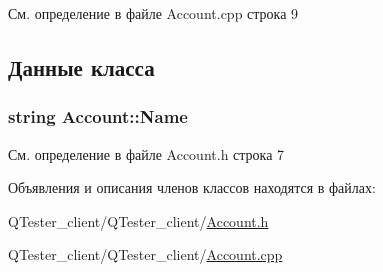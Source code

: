 См. определение в файле Account.\+cpp строка 9



\subsection{Данные класса}
\hypertarget{class_account_af13e63ff7407ac19e41e91afc40185b7}{}
\subsubsection[{Name}]{\setlength{\rightskip}{0pt plus 5cm}string Account\+::\+Name\hspace{0.3cm}{\ttfamily [protected]}}\label{class_account_af13e63ff7407ac19e41e91afc40185b7}


См. определение в файле Account.\+h строка 7



Объявления и описания членов классов находятся в файлах\+:\begin{DoxyCompactItemize}
\item 
Q\+Tester\+\_\+client/\+Q\+Tester\+\_\+client/\hyperlink{_account_8h}{Account.\+h}\item 
Q\+Tester\+\_\+client/\+Q\+Tester\+\_\+client/\hyperlink{_account_8cpp}{Account.\+cpp}\end{DoxyCompactItemize}
